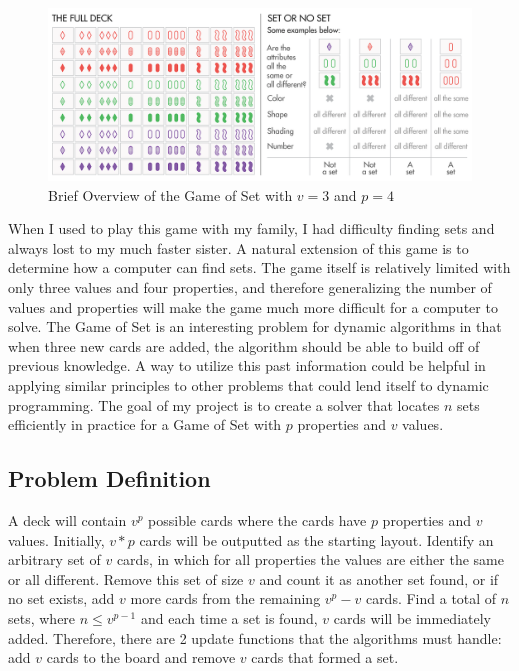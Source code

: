 \documentclass[pageno]{jpaper}
\begin{document}
\begin{figure}[htbb]
\centering
\begin{minipage}[b]{.75\linewidth}
\includegraphics[width=\linewidth]{SetOverview.png}
\caption{Brief Overview of the Game of Set with $v=3$ and $p=4$ ~\cite{setOverview}}
\label{fig:SetOverview}
\end{minipage}
\end{figure}

When I used to play this game with my family, I had difficulty finding sets and always lost to my much faster sister. A natural extension of this game is to determine how a computer can find sets. The game itself is relatively limited with only three values and four properties, and therefore generalizing the number of values and properties will make the game much more difficult for a computer to solve. The Game of Set is an interesting problem for dynamic algorithms in that when three new cards are added, the algorithm should be able to build off of previous knowledge. A way to utilize this past information could be helpful in applying similar principles to other problems that could lend itself to dynamic programming. The goal of my project is to create a solver that locates $n$ sets efficiently in practice for a Game of Set with $p$ properties and $v$ values. 


\subsection{Problem Definition}

A deck will contain $v^p$ possible cards where the cards have $p$ properties and $v$ values. Initially, $v*p$ cards will be outputted as the starting layout. Identify an arbitrary set of $v$ cards, in which for all properties the values are either the same or all different. Remove this set of size $v$ and count it as another set found, or if no set exists, add $v$ more cards from the remaining $v^p - v$ cards. Find a total of $n$ sets, where $n \leq v^{p-1}$ and each time a set is found, $v$ cards will be immediately added. Therefore, there are 2 update functions that the algorithms must handle: add $v$ cards to the board and remove $v$ cards that formed a set. 
\end{document}
